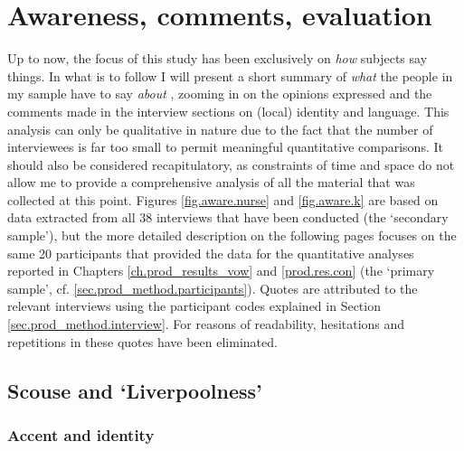 \chapter{Awareness, comments, evaluation}
\label{prod.res.qual}

Up to now, the focus of this study has been exclusively on \emph{how} subjects say things.
In what is to follow I will present a short summary of \emph{what} the people in my sample have to say \emph{about} , zooming in on the opinions expressed and the comments made in the interview sections on (local) identity and language.
This analysis can only be qualitative in nature due to the fact that the number of interviewees is far too small to permit meaningful quantitative comparisons.
It should also be considered recapitulatory, as constraints of time and space do not allow me to provide a comprehensive analysis of all the material that was collected at this point.
Figures \ref{fig.aware.nurse} and \ref{fig.aware.k} are based on data extracted from all 38 interviews that have been conducted (the `secondary sample'), but the more detailed description on the following pages focuses on the same 20 participants that provided the data for the quantitative analyses reported in Chapters \ref{ch.prod_results_vow} and \ref{prod.res.con} (the `primary sample', cf. \ref{sec.prod_method.participants}).
Quotes are attributed to the relevant interviews using the participant codes explained in Section \ref{sec.prod_method.interview}.
For reasons of readability, hesitations and repetitions in these quotes have been eliminated.

\section{Scouse and `Liverpoolness'}

\subsection{Accent and identity}

